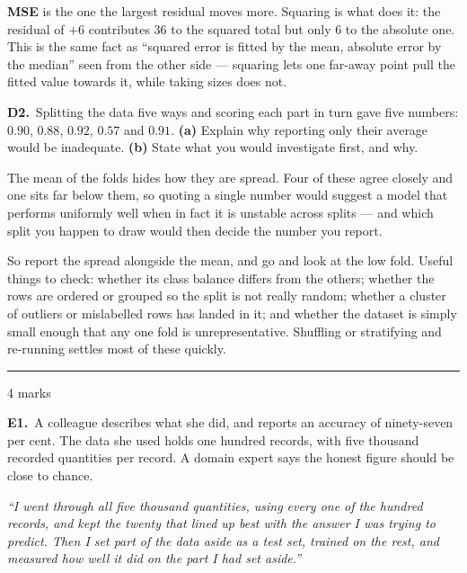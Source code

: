 \documentclass[10pt,a4paper]{article}
\newcommand{\parthead}[2]{\vspace{2pt}\noindent\rule{\linewidth}{0.4pt}\par\vspace{2pt}%
  \noindent{\bfseries Part #1}\hfill{\small #2}\par\vspace{1pt}}
\newcommand{\sol}[1]{\textbf{#1}}
\begin{document}
\sol{MSE} is the one the largest residual moves more. Squaring is what does it: the residual of $+6$ contributes $36$ to the squared total but only $6$ to the absolute one. This is the same fact as ``squared error is fitted by the mean, absolute error by the median'' seen from the other side --- squaring lets one far-away point pull the fitted value towards it, while taking sizes does not.

\vspace{6pt}

\textbf{D2.}\ Splitting the data five ways and scoring each part in turn gave five numbers: $0.90$, $0.88$, $0.92$, $0.57$ and $0.91$. \textbf{(a)} Explain why reporting only their average would be inadequate. \textbf{(b)} State what you would investigate first, and why.

\vspace{2pt}

The mean of the folds hides how they are spread. Four of these agree closely and one sits far below them, so quoting a single number would suggest a model that performs uniformly well when in fact it is unstable across splits --- and which split you happen to draw would then decide the number you report.\par\vspace{1mm}So report the spread alongside the mean, and go and look at the low fold. Useful things to check: whether its class balance differs from the others; whether the rows are ordered or grouped so the split is not really random; whether a cluster of outliers or mislabelled rows has landed in it; and whether the dataset is simply small enough that any one fold is unrepresentative. Shuffling or stratifying and re-running settles most of these quickly.

\newpage

\parthead{E --- Reasoning}{4 marks}

\textbf{E1.}\ A colleague describes what she did, and reports an accuracy of ninety-seven per cent. The data she
used holds one hundred records, with five thousand recorded quantities per record. A domain expert says the
honest figure should be close to chance.

\vspace{2mm}
\hspace*{6mm}\parbox{0.9\linewidth}{\emph{``I went through all five thousand quantities, using every one of
the hundred records, and kept the twenty that lined up best with the answer I was trying to predict. Then I
set part of the data aside as a test set, trained on the rest, and measured how well it did on the part I had
set aside.''}}
\end{document}
